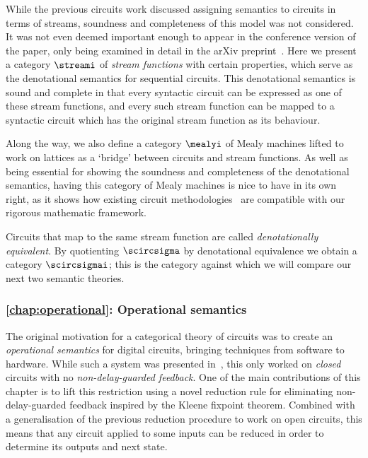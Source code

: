 While the previous circuits work discussed assigning semantics to circuits in
terms of streams, soundness and completeness of this model was not considered.
It was not even deemed important enough to appear in the conference version of
the paper, only being examined in detail in the arXiv
preprint~\cite{ghica2017diagrammatica}.
Here we present a category \(\streami\) of \emph{stream functions} with certain
properties, which serve as the denotational semantics for sequential circuits.
This denotational semantics is sound and complete in that every syntactic
circuit can be expressed as one of these stream functions, and every such stream
function can be mapped to a syntactic circuit which has the original stream
function as its behaviour.

Along the way, we also define a category \(\mealyi\)  of Mealy machines lifted
to work on lattices as a `bridge' between circuits and stream functions.
As well as being essential for showing the soundness and completeness of the
denotational semantics, having this category of Mealy machines is nice to have
in its own right, as it shows how existing circuit
methodologies~\cite{kohavi2009switching} are compatible with our rigorous
mathematic framework.

Circuits that map to the same stream function are called
\emph{denotationally equivalent}.
By quotienting \(\scircsigma\) by denotational equivalence we obtain a category
\(\scircsigmai\); this is the category against which we will compare our next
two semantic theories.

\subsubsection{\cref{chap:operational}: Operational semantics}

The original motivation for a categorical theory of circuits was to create an
\emph{operational semantics} for digital circuits, bringing techniques from
software to hardware.
While such a system was presented in~\cite{ghica2017diagrammatic}, this only
worked on \emph{closed} circuits with no \emph{non-delay-guarded feedback}.
One of the main contributions of this chapter is to lift this restriction using
a novel reduction rule for eliminating non-delay-guarded feedback inspired by
the Kleene fixpoint theorem.
Combined with a generalisation of the previous reduction procedure to
work on open circuits, this means that any circuit applied to some inputs can be
reduced in order to determine its outputs and next state.

